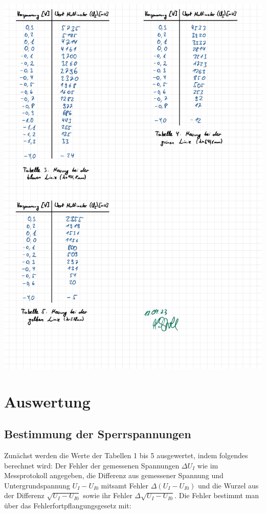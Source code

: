 \documentclass{article}
\begin{document}
\includegraphics[width=\textwidth]{graphics/mess3.jpg}
\newpage

\addtocounter{table}{5}

\section{Auswertung}

\subsection{Bestimmung der Sperrspannungen}

Zunächst werden die Werte der Tabellen 1 bis 5 ausgewertet, indem folgendes berechnet wird: Der Fehler der gemessenen Spannungen $\Delta U_I$ wie im Messprotokoll angegeben, die Differenz aus gemessener Spannung und Untergrundspannung $U_I - U_{I0}$ mitsamt Fehler $\Delta (U_I - U_{I0})$ und die Wurzel aus der Differenz $\sqrt{U_I - U_{I0}}$ sowie ihr Fehler $\Delta \sqrt{U_I - U_{I0}}$. Die Fehler bestimmt man über das Fehlerfortpflangungsgesetz mit:
\end{document}
